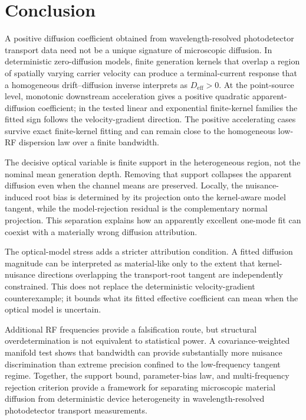 \documentclass[aps,pra,twocolumn,superscriptaddress,nofootinbib]{revtex4-2}
\newcommand{\Deff}{D_{\mathrm{eff}}}
\begin{document}
\section{Conclusion}

A positive diffusion coefficient obtained from wavelength-resolved photodetector transport data need not be a unique signature of microscopic diffusion. In deterministic zero-diffusion models, finite generation kernels that overlap a region of spatially varying carrier velocity can produce a terminal-current response that a homogeneous drift--diffusion inverse interprets as $\Deff>0$.  At the point-source level, monotonic downstream acceleration gives a positive quadratic apparent-diffusion coefficient; in the tested linear and exponential finite-kernel families the fitted sign follows the velocity-gradient direction.  The positive accelerating cases survive exact finite-kernel fitting and can remain close to the homogeneous low-RF dispersion law over a finite bandwidth.

The decisive optical variable is finite support in the heterogeneous region, not the nominal mean generation depth. Removing that support collapses the apparent diffusion even when the channel means are preserved. Locally, the nuisance-induced root bias is determined by its projection onto the kernel-aware model tangent, while the model-rejection residual is the complementary normal projection. This separation explains how an apparently excellent one-mode fit can coexist with a materially wrong diffusion attribution.

The optical-model stress adds a stricter attribution condition. A fitted diffusion magnitude can be interpreted as material-like only to the extent that kernel-nuisance directions overlapping the transport-root tangent are independently constrained. This does not replace the deterministic velocity-gradient counterexample; it bounds what its fitted effective coefficient can mean when the optical model is uncertain.


Additional RF frequencies provide a falsification route, but structural overdetermination is not equivalent to statistical power. A covariance-weighted manifold test shows that bandwidth can provide substantially more nuisance discrimination than extreme precision confined to the low-frequency tangent regime. Together, the support bound, parameter-bias law, and multi-frequency rejection criterion provide a framework for separating microscopic material diffusion from deterministic device heterogeneity in wavelength-resolved photodetector transport measurements.



\end{document}
